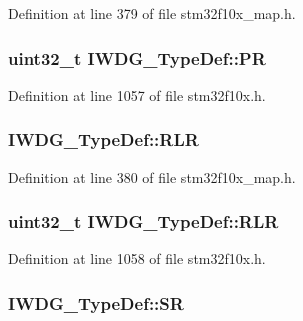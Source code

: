 Definition at line 379 of file stm32f10x\+\_\+map.\+h.

\subsubsection[{\texorpdfstring{PR}{PR}}]{ {\bf uint32\+\_\+t} I\+W\+D\+G\+\_\+\+Type\+Def\+::\+PR}\hypertarget{struct_i_w_d_g___type_def_a5f2717885ff171e686e0347af9e6b68d}{}\label{struct_i_w_d_g___type_def_a5f2717885ff171e686e0347af9e6b68d}


Definition at line 1057 of file stm32f10x.\+h.

\subsubsection[{\texorpdfstring{R\+LR}{RLR}}]{ I\+W\+D\+G\+\_\+\+Type\+Def\+::\+R\+LR}\hypertarget{struct_i_w_d_g___type_def_a3bd3ead202b69da2549f9eabff1eb68c}{}\label{struct_i_w_d_g___type_def_a3bd3ead202b69da2549f9eabff1eb68c}


Definition at line 380 of file stm32f10x\+\_\+map.\+h.

\subsubsection[{\texorpdfstring{R\+LR}{RLR}}]{ {\bf uint32\+\_\+t} I\+W\+D\+G\+\_\+\+Type\+Def\+::\+R\+LR}\hypertarget{struct_i_w_d_g___type_def_aa3703eaa40e447dcacc69c0827595532}{}\label{struct_i_w_d_g___type_def_aa3703eaa40e447dcacc69c0827595532}


Definition at line 1058 of file stm32f10x.\+h.

\subsubsection[{\texorpdfstring{SR}{SR}}]{ I\+W\+D\+G\+\_\+\+Type\+Def\+::\+SR}\hypertarget{struct_i_w_d_g___type_def_a74a3162d8bab5645e11877a2ccb967fb}{}\label{struct_i_w_d_g___type_def_a74a3162d8bab5645e11877a2ccb967fb}


